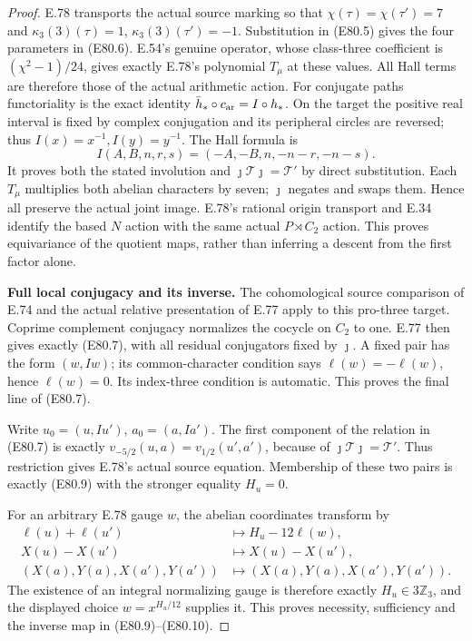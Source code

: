 \begin{proof}
E.78 transports the actual source marking so that
$\chi(\tau)=\chi(\tau')=7$ and
$\kappa_3(3)(\tau)=1$, $\kappa_3(3)(\tau')=-1$.
Substitution in (E80.5) gives the four parameters
in (E80.6). E.54's genuine operator, whose
class-three coefficient is $(\chi^2-1)/24$, gives
exactly E.78's polynomial $T_\mu$ at these values.
All Hall terms are therefore those of the actual
arithmetic action. For conjugate paths functoriality
is the exact identity
$\bar h_*\circ c_{\rm ar}=I\circ h_*$.
On the target the positive real interval is fixed
by complex conjugation and its peripheral circles
are reversed; thus $I(x)=x^{-1},I(y)=y^{-1}$.
The Hall formula is
\[
      I(A,B,n,r,s)=(-A,-B,n,-n-r,-n-s).
 \tag{E80.19}
\]
It proves both the stated involution and
$\jmath\mathcal T\jmath=\mathcal T'$ by direct
substitution. Each $T_\mu$ multiplies both abelian
characters by seven; $\jmath$ negates and swaps
them. Hence all preserve the actual joint image.
E.78's rational origin transport and E.34 identify
the based $N$ action with the same actual
$P\rtimes C_2$ action. This proves equivariance of
the quotient maps, rather than inferring a descent
from the first factor alone.

\textbf{Full local conjugacy and its inverse.}
The cohomological source comparison of E.74 and the
actual relative presentation of E.77 apply to this
pro-three target. Coprime complement conjugacy
normalizes the cocycle on $C_2$ to one. E.77 then
gives exactly (E80.7), with all residual conjugators
fixed by $\jmath$. A fixed pair has the form
$(w,Iw)$; its common-character condition says
$\ell(w)=-\ell(w)$, hence $\ell(w)=0$.
Its index-three condition is automatic. This proves
the final line of (E80.7).

Write $u_0=(u,Iu')$, $a_0=(a,Ia')$. The first
component of the relation in (E80.7) is exactly
$v_{-5/2}(u,a)=v_{1/2}(u',a')$, because of
$\jmath\mathcal T\jmath=\mathcal T'$. Thus
restriction gives E.78's actual source equation.
Membership of these two pairs is exactly (E80.9)
with the stronger equality $H_u=0$.

For an arbitrary E.78 gauge $w$, the abelian
coordinates transform by
\[
 \begin{aligned}
 \ell(u)+\ell(u')&\longmapsto H_u-12\ell(w),\\
 X(u)-X(u')&\longmapsto X(u)-X(u'),\\
 (X(a),Y(a),X(a'),Y(a'))&\longmapsto
                         (X(a),Y(a),X(a'),Y(a')).
 \end{aligned}
 \tag{E80.20}
\]
The existence of an integral normalizing gauge is
therefore exactly $H_u\in3\mathbb Z_3$, and the
displayed choice $w=x^{H_u/12}$ supplies it.
This proves necessity, sufficiency and the inverse
map in (E80.9)--(E80.10).


\end{proof}
